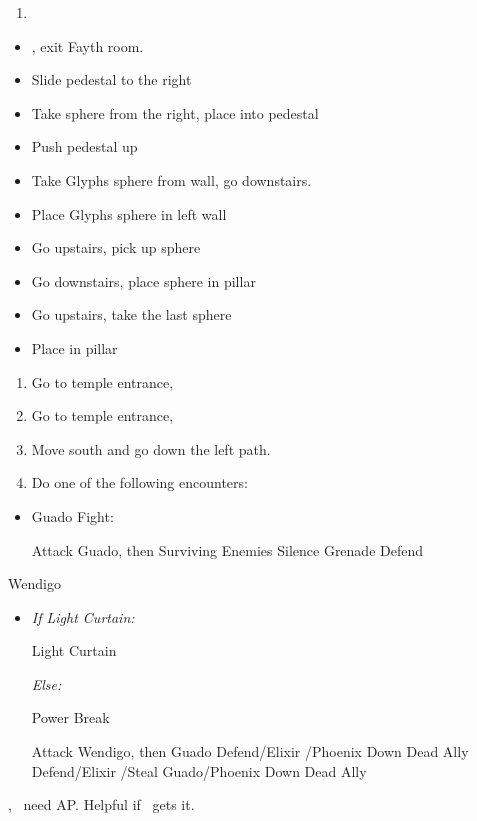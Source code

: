 \begin{enumerate}[resume]
	\item \formation{\rikku}{\tidus}{\yuna}
\end{enumerate}
\begin{trial}
	\begin{itemize}
		\item \save, exit Fayth room.
		\item Slide pedestal to the right
		\item Take sphere from the right, place into pedestal
		\item Push pedestal up
		\item Take Glyphs sphere from wall, go downstairs.
		\item Place Glyphs sphere in left wall
		\item Go upstairs, pick up sphere
		\item Go downstairs, place sphere in pillar
		\item Go upstairs, take the last sphere
		\item Place in pillar
	\end{itemize}
\end{trial}
\begin{enumerate}[resume]
	\item Go to temple entrance, \sd
	\item Go to temple entrance, \sd
	\item Move south and go down the left path.
	      \vfill
	      \newpage
	\item Do one of the following encounters:
\end{enumerate}
\begin{encounters}
	\begin{itemize}
		\item Guado Fight:
		      \begin{itemize}
			      \tidusf Attack Guado, then Surviving Enemies
			      \rikkuf Silence Grenade
			      \yunaf Defend
		      \end{itemize}
	\end{itemize}
\end{encounters}
\begin{battle}[18000]{Wendigo}
	\begin{itemize}
		\tidusf Haste \tidus
		\tidusf Switch Weapon to Brotherhood
		\tidusf Attack Guado B (Top One)
		\item \textit{If Light Curtain:}
		      \begin{itemize}
			      \rikkuf Light Curtain \tidus
		      \end{itemize}
		      \textit{Else:}
		      \begin{itemize}
			      \switch{\rikku}{\auron}
			      \auronf Power Break
		      \end{itemize}
		      \tidusf Attack Wendigo, then Guado
		      \yunaf Defend/Elixir \tidus/Phoenix Down Dead Ally
		      \rikkuf Defend/Elixir \tidus/Steal Guado/Phoenix Down Dead Ally
		      \switch{\yuna}{\lulu}
	\end{itemize}
	\yuna, \tidus\ need AP. Helpful if \lulu\ gets it.
\end{battle}

